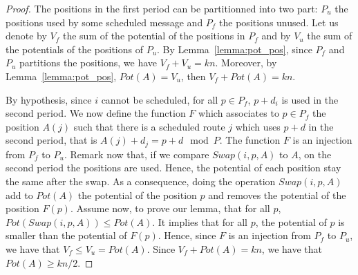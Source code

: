 \documentclass[10pt, conference, letterpaper]{IEEEtran}
\begin{document}
\begin{proof}\label{lemma:swap}
The positions in the first period can be partitionned into two part: $P_{u}$ the positions used by some scheduled message and $P_{f}$ the positions unused.
Let us denote by $V_f$ the sum of the potential of the positions in $P_f$ and by $V_u$ the sum of the potentials of the positions of $P_u$. By Lemma~\ref{lemma:pot_pos}, since $P_f$ and $P_u$ partitions the positions, we have $V_f + V_u = kn$. Moreover, by Lemma~\ref{lemma:pot_pos}, $Pot(A) = V_u$, then $V_f + Pot(A) = kn$.

By hypothesis, since $i$ cannot be scheduled, for all $p \in P_{f}$, $p+d_i$ is used in the second period. We now define the function $F$ which associates to $p \in P_{f}$ the position $A(j)$ such that there is a scheduled route $j$ which uses $p+d$ in the second period, that is $A(j) + d_j = p + d \mod P$. The function $F$ is an injection from $P_{f}$ to $P_u$. Remark now that, if we compare $Swap(i,p,A)$ to $A$, on the second period the positions are used. Hence, the potential of each position stay the same after the swap. As a consequence, doing the operation $Swap(i,p,A)$ add to $Pot(A)$ the potential of the position $p$ and removes the potential of the position $F(p)$. 
Assume now, to prove our lemma, that for all $p$, $Pot(Swap(i,p,A)) \leq Pot(A)$. It implies that for all $p$, the potential of $p$ is smaller than the potential of $F(p)$. Hence,
since $F$ is an injection from $P_f$ to $P_u$, we have that $V_f \leq V_u = Pot(A)$.
Since $V_f + Pot(A) = kn$, we have that $Pot(A) \geq kn/2$.
\end{proof}
\end{document}
